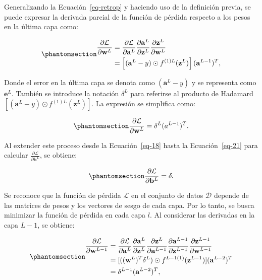 \documentclass[
  us-letterpaper,
]{scrreprt}
\theoremstyle{plain}
\theoremstyle{definition}
\theoremstyle{plain}
\theoremstyle{definition}
\theoremstyle{remark}
\begin{document}
Generalizando la Ecuación~\ref{eq-retrop} y haciendo uso de la
definición previa, se puede expresar la derivada parcial de la función
de pérdida respecto a los pesos en la última capa como:

\begin{equation}\phantomsection\label{eq-20}{\begin{split}\frac{\partial \mathcal L}{\partial \mathbf w^L} &= \frac{\partial \mathcal L}{\partial \mathbf a^L}\frac{\partial \mathbf a^L}{\partial \mathbf z^L}\frac{\partial \mathbf z^L}{\partial \mathbf w^L}\\&= \left[(\mathbf a^L - y)\odot f^{(1)L}(\mathbf z^L)\right] (\mathbf a^{L-1})^T,\end{split}}\end{equation}

Donde el error en la última capa se denota como \((\mathbf a^L - y)\) y
se representa como \(\mathbf e^L\). También se introduce la notación
\(\delta^L\) para referirse al producto de Hadamard
\([(\mathbf a^L - y)\odot f^{(1)L}(\mathbf z^L)]\). La expresión se
simplifica como:

\begin{equation}\phantomsection\label{eq-21}{\frac{\partial \mathcal L}{\partial \mathbf w^L} = \delta^L (a^{L-1})^T.}\end{equation}

Al extender este proceso desde la Ecuación~\ref{eq-18} hasta la
Ecuación~\ref{eq-21} para calcular
\(\frac{\partial \mathcal L}{\partial \mathbf b^L}\), se obtiene:

\begin{equation}\phantomsection\label{eq-22}{\frac{\partial \mathcal L}{\partial \mathbf b^L} = \delta.}\end{equation}

Se reconoce que la función de pérdida \(\mathcal L\) en el conjunto de
datos \(\mathscr D\) depende de las matrices de pesos y los vectores de
sesgo de cada capa. Por lo tanto, se busca minimizar la función de
pérdida en cada capa \(l\). Al considerar las derivadas en la capa
\(L-1\), se obtiene:

\begin{equation}\phantomsection\label{eq-23}{
\begin{split}\frac{\partial \mathcal L}{\partial \mathbf w^{L-1}}&= \frac{\partial \mathcal L}{\partial \mathbf a^{L}}\frac{\partial \mathbf a^L}{\partial \mathbf z^{L}}\frac{\partial \mathbf z^L}{\partial \mathbf a^{L-1}}\frac{\partial \mathbf a^{L-1}}{\partial \mathbf z^{L-1}}\frac{\partial \mathbf z^{L-1}}{\partial \mathbf w^{L-1}}\\
&= [((\mathbf w^L)^T \delta^L)\odot f^{L-1(1)}(\mathbf z^{L-1})](\mathbf a^{L-2})^T\\
&= \delta^{L-1}(\mathbf a^{L-2})^T,\end{split}
}\end{equation}
\end{document}
